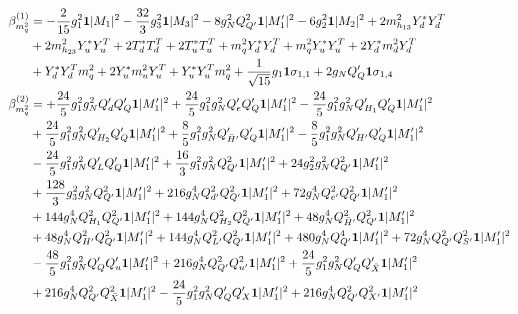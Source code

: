 {\allowdisplaybreaks  \begin{align} 
\beta_{m_q^2}^{(1)} & =  
-\frac{2}{15} g_{1}^{2} {\bf 1} |M_1|^2 -\frac{32}{3} g_{3}^{2} {\bf 1} |M_3|^2 -8 g_{N}^{2} Q_{Q'}^{2} {\bf 1} |M_1'|^2 -6 g_{2}^{2} {\bf 1} |M_2|^2 +2 m_{h_{13}}^2 {Y_d^*  Y_{d}^{T}} \nonumber \\ 
 &+2 m_{h_{23}}^2 {Y_u^*  Y_{u}^{T}} +2 {T_d^*  T_{d}^{T}} +2 {T_u^*  T_{u}^{T}} +{m_q^2  Y_d^*  Y_{d}^{T}}+{m_q^2  Y_u^*  Y_{u}^{T}}+2 {Y_d^*  m_d^2  Y_{d}^{T}} \nonumber \\ 
 &+{Y_d^*  Y_{d}^{T}  m_q^2}+2 {Y_u^*  m_u^2  Y_{u}^{T}} +{Y_u^*  Y_{u}^{T}  m_q^2}+\frac{1}{\sqrt{15}} g_1 {\bf 1} \sigma_{1,1} +2 g_N Q_Q' {\bf 1} \sigma_{1,4} \\ 
\beta_{m_q^2}^{(2)} & =  
+\frac{24}{5} g_{1}^{2} g_{N}^{2} Q_d' Q_Q' {\bf 1} |M_1'|^2 +\frac{24}{5} g_{1}^{2} g_{N}^{2} Q_e' Q_Q' {\bf 1} |M_1'|^2 -\frac{24}{5} g_{1}^{2} g_{N}^{2} Q_{H_1}' Q_Q' {\bf 1} |M_1'|^2 \nonumber \\ 
 &+\frac{24}{5} g_{1}^{2} g_{N}^{2} Q_{H_2}' Q_Q' {\bf 1} |M_1'|^2 +\frac{8}{5} g_{1}^{2} g_{N}^{2} Q_{\bar{H}'}' Q_Q' {\bf 1} |M_1'|^2 -\frac{8}{5} g_{1}^{2} g_{N}^{2} Q_{H'}' Q_Q' {\bf 1} |M_1'|^2 \nonumber \\ 
 &-\frac{24}{5} g_{1}^{2} g_{N}^{2} Q_L' Q_Q' {\bf 1} |M_1'|^2 +\frac{16}{3} g_{1}^{2} g_{N}^{2} Q_{Q'}^{2} {\bf 1} |M_1'|^2 +24 g_{2}^{2} g_{N}^{2} Q_{Q'}^{2} {\bf 1} |M_1'|^2 \nonumber \\ 
 &+\frac{128}{3} g_{3}^{2} g_{N}^{2} Q_{Q'}^{2} {\bf 1} |M_1'|^2 +216 g_{N}^{4} Q_{d'}^{2} Q_{Q'}^{2} {\bf 1} |M_1'|^2 +72 g_{N}^{4} Q_{e'}^{2} Q_{Q'}^{2} {\bf 1} |M_1'|^2 \nonumber \\ 
 &+144 g_{N}^{4} Q_{H_1}^{2} Q_{Q'}^{2} {\bf 1} |M_1'|^2 +144 g_{N}^{4} Q_{H_2}^{2} Q_{Q'}^{2} {\bf 1} |M_1'|^2 +48 g_{N}^{4} Q_{\bar{H}'}^{2} Q_{Q'}^{2} {\bf 1} |M_1'|^2 \nonumber \\ 
 &+48 g_{N}^{4} Q_{H'}^{2} Q_{Q'}^{2} {\bf 1} |M_1'|^2 +144 g_{N}^{4} Q_{L'}^{2} Q_{Q'}^{2} {\bf 1} |M_1'|^2 +480 g_{N}^{4} Q_{Q'}^{4} {\bf 1} |M_1'|^2 +72 g_{N}^{4} Q_{Q'}^{2} Q_{S'}^{2} {\bf 1} |M_1'|^2 \nonumber \\ 
 &-\frac{48}{5} g_{1}^{2} g_{N}^{2} Q_Q' Q_u' {\bf 1} |M_1'|^2 +216 g_{N}^{4} Q_{Q'}^{2} Q_{u'}^{2} {\bf 1} |M_1'|^2 +\frac{24}{5} g_{1}^{2} g_{N}^{2} Q_Q' Q_{\bar{X}}' {\bf 1} |M_1'|^2 \nonumber \\ 
 &+216 g_{N}^{4} Q_{Q'}^{2} Q_{\bar{X}}^{2} {\bf 1} |M_1'|^2 -\frac{24}{5} g_{1}^{2} g_{N}^{2} Q_Q' Q_X' {\bf 1} |M_1'|^2 +216 g_{N}^{4} Q_{Q'}^{2} Q_{X'}^{2} {\bf 1} |M_1'|^2 \nonumber \\ 

\end{align}}
